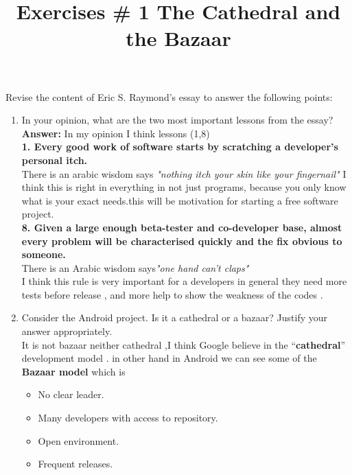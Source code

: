 \documentclass[11pt]{scrartcl}
\title{Exercises \# 1  The Cathedral and the Bazaar }
\begin{document}
\maketitle
Revise the content of Eric S. Raymond's essay to answer the following points:
	\begin{enumerate}
		\item In your opinion, what are the two most important lessons from the essay?\\
		
			\textbf{Answer:} In my opinion I  think lessons (1,8)\\
			
\textbf{ 1. Every good work of software starts by scratching a developer's personal itch.}\\
There is an arabic wisdom says \emph{"nothing itch your skin like your fingernail"}
I think this is right in everything in   not just programs,  because you  only know what is your exact needs.this will be motivation for starting a free software project.\\
\textbf{ 8. Given a large enough beta-tester and co-developer base, almost every problem will be characterised quickly and the fix obvious to someone.}\\
There is an Arabic wisdom says\emph{"one hand can't claps"} \\ I think this rule is very important for a developers in general they need more tests before release , and more help to show the weakness of the codes .\\
		\item Consider the Android project. Is it a cathedral or a bazaar? Justify your answer appropriately.\\
	It is not bazaar neither  cathedral ,I think Google believe in the “\textbf{cathedral}” development model .
	in other hand in Android we can see  some of  the \textbf{Bazaar model} which is 
\begin{itemize}
\item No clear leader.
\item Many developers with access to repository.
\item Open environment.
\item Frequent releases.
\end{itemize}
	\end{enumerate}
\end{document}

